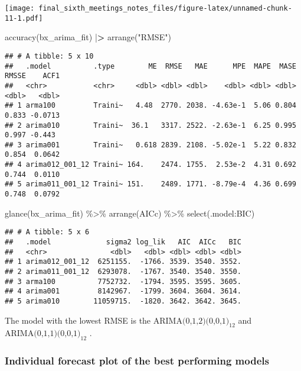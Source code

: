 \documentclass[
]{article}
\newenvironment{Shaded}{\begin{snugshade}}{\end{snugshade}}
\newcommand{\ErrorTok}[1]{\textcolor[rgb]{0.64,0.00,0.00}{\textbf{#1}}}
\newcommand{\FunctionTok}[1]{\textcolor[rgb]{0.00,0.00,0.00}{#1}}
\newcommand{\NormalTok}[1]{#1}
\newcommand{\SpecialCharTok}[1]{\textcolor[rgb]{0.00,0.00,0.00}{#1}}
\newcommand{\StringTok}[1]{\textcolor[rgb]{0.31,0.60,0.02}{#1}}
\begin{document}
\texttt{[image: final\_sixth\_meetings\_notes\_files/figure-latex/unnamed-chunk-11-1.pdf]}

\begin{Shaded}
\begin{Highlighting}[]
\FunctionTok{accuracy}\NormalTok{(bx\_arima\_fit) }\SpecialCharTok{|}\ErrorTok{\textgreater{}} \FunctionTok{arrange}\NormalTok{(}\StringTok{"RMSE"}\NormalTok{)}
\end{Highlighting}
\end{Shaded}

\begin{verbatim}
## # A tibble: 5 x 10
##   .model          .type        ME  RMSE   MAE      MPE  MAPE  MASE RMSSE    ACF1
##   <chr>           <chr>     <dbl> <dbl> <dbl>    <dbl> <dbl> <dbl> <dbl>   <dbl>
## 1 arma100         Traini~   4.48  2770. 2038. -4.63e-1  5.06 0.804 0.833 -0.0713
## 2 arima010        Traini~  36.1   3317. 2522. -2.63e-1  6.25 0.995 0.997 -0.443 
## 3 arima001        Traini~   0.618 2839. 2108. -5.02e-1  5.22 0.832 0.854  0.0642
## 4 arima012_001_12 Traini~ 164.    2474. 1755.  2.53e-2  4.31 0.692 0.744  0.0110
## 5 arima011_001_12 Traini~ 151.    2489. 1771. -8.79e-4  4.36 0.699 0.748  0.0792
\end{verbatim}

\begin{Shaded}
\begin{Highlighting}[]
\FunctionTok{glance}\NormalTok{(bx\_arima\_fit) }\SpecialCharTok{\%\textgreater{}\%} 
  \FunctionTok{arrange}\NormalTok{(AICc) }\SpecialCharTok{\%\textgreater{}\%} 
  \FunctionTok{select}\NormalTok{(.model}\SpecialCharTok{:}\NormalTok{BIC)}
\end{Highlighting}
\end{Shaded}

\begin{verbatim}
## # A tibble: 5 x 6
##   .model             sigma2 log_lik   AIC  AICc   BIC
##   <chr>               <dbl>   <dbl> <dbl> <dbl> <dbl>
## 1 arima012_001_12  6251155.  -1766. 3539. 3540. 3552.
## 2 arima011_001_12  6293078.  -1767. 3540. 3540. 3550.
## 3 arma100          7752732.  -1794. 3595. 3595. 3605.
## 4 arima001         8142967.  -1799. 3604. 3604. 3614.
## 5 arima010        11059715.  -1820. 3642. 3642. 3645.
\end{verbatim}

The model with the lowest RMSE is the
\(\text{ARIMA(0,1,2)(0,0,1)}_{12}\) and
\(\text{ARIMA(0,1,1)(0,0,1)}_{12}\) .

\hypertarget{individual-forecast-plot-of-the-best-performing-models}{%
\subsubsection{Individual forecast plot of the best performing
models}\label{individual-forecast-plot-of-the-best-performing-models}}
\end{document}
